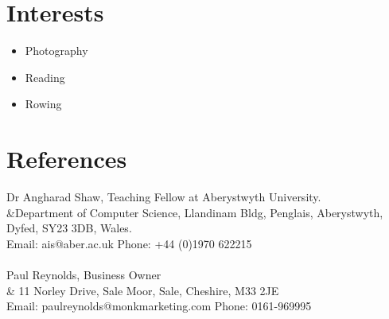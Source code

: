 \documentclass[a4paper,10pt]{article}
\begin{document}
\section*{Interests}
\begin{itemize}
\item Photography 
\item Reading
\item Rowing
\end{itemize}
\section*{References}
Dr Angharad Shaw, Teaching Fellow at  Aberystwyth University.\\
&Department of Computer Science, Llandinam Bldg, Penglais, Aberystwyth, Dyfed, SY23 3DB, Wales.\\
Email: ais@aber.ac.uk Phone: +44 (0)1970 622215\\
\\
Paul Reynolds, Business Owner\\    
& 11 Norley Drive, Sale Moor, Sale, Cheshire, M33 2JE\\
Email: paulreynolds@monkmarketing.com Phone: 0161-969995\\
\\
\end{document}
